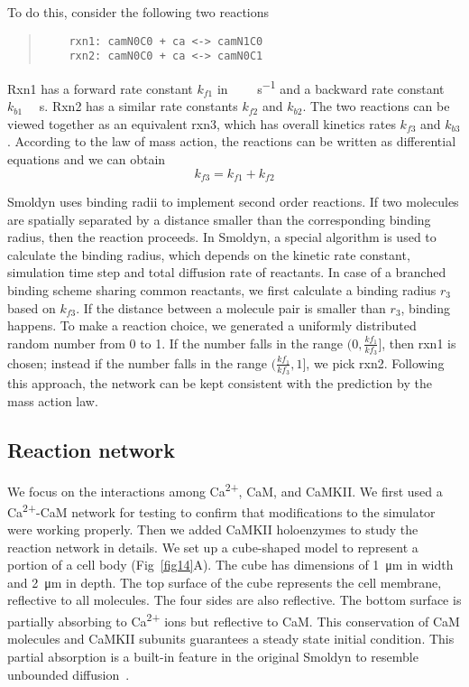 \documentclass[10pt,letterpaper]{article}
\begin{document}
To do this, consider the following two reactions
\begin{quote}
\begin{verbatim}
	rxn1: camN0C0 + ca <-> camN1C0
	rxn2: camN0C0 + ca <-> camN0C1
\end{verbatim}
\end{quote}

Rxn1 has a forward rate constant $k_{f1}$ in \SI{}{\per\micro\Molar\per\s} and a backward rate constant $k_{b1}$ \SI{}{\per\s}. Rxn2 has a similar rate constants $k_{f2}$ and $k_{b2}$. The two reactions can be viewed together as an equivalent rxn3, which has overall kinetics rates $k_{f3}$ and $k_{b3}$. According to the law of mass action, the reactions can be written as differential equations and we can obtain
\begin{equation}
	k_{f3}=k_{f1}+k_{f2}
\end{equation}

Smoldyn uses binding radii to implement second order reactions. If two molecules are spatially separated by a distance smaller than the corresponding binding radius, then the reaction proceeds. In Smoldyn, a special algorithm is used to calculate the binding radius, which depends on the kinetic rate constant, simulation time step and total diffusion rate of reactants. In case of a branched binding scheme sharing common reactants, we first calculate a binding radius $r_3$ based on $k_{f3}$. If the distance between a molecule pair is smaller than $r_3$, binding happens. To make a reaction choice, we generated a uniformly distributed random number from 0 to 1. If the number falls in the range $(0,\frac{kf_1}{kf_3}]$, then rxn1 is chosen; instead if the number falls in the range $(\frac{kf_1}{kf_3}, 1]$, we pick rxn2. Following this approach, the network can be kept consistent with the prediction by the mass action law. 

\subsection*{Reaction network}
We focus on the interactions among Ca\textsuperscript{2+}, CaM, and CaMKII. We first used a Ca\textsuperscript{2+}-CaM network for testing to confirm that modifications to the simulator were working properly. Then we added CaMKII holoenzymes to study the reaction network in details. We set up a cube-shaped model to represent a portion of a cell body (Fig~\ref{fig14}A). The cube has dimensions of \SI{1}{\um} in width and \SI{2}{\um} in depth. The top surface of the cube represents the cell membrane, reflective to all molecules. The four sides are also reflective. The bottom surface is partially absorbing to Ca\textsuperscript{2+} ions but reflective to CaM. This conservation of CaM molecules and CaMKII subunits guarantees a steady state initial condition. This partial absorption is a built-in feature in the original Smoldyn to resemble unbounded diffusion~\cite{Andrews:2009dr}.
\end{document}
